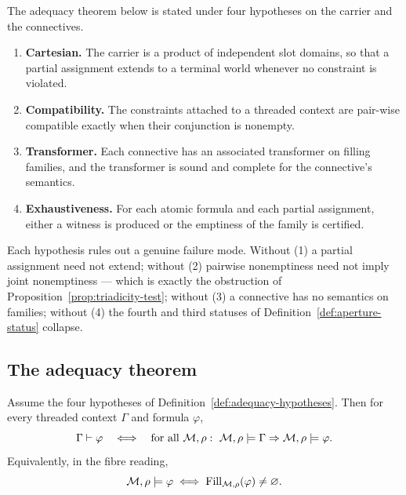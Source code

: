 \begin{definition}\label{def:adequacy-hypotheses}
The adequacy theorem below is stated under four hypotheses on the carrier and the
connectives.
\begin{enumerate}
\item \textbf{Cartesian.}  The carrier is a product of independent slot domains, so that a
  partial assignment extends to a terminal world whenever no constraint is violated.
\item \textbf{Compatibility.}  The constraints attached to a threaded context are
  pair-wise compatible exactly when their conjunction is nonempty.
\item \textbf{Transformer.}  Each connective has an associated transformer on filling
  families, and the transformer is sound and complete for the connective's semantics.
\item \textbf{Exhaustiveness.}  For each atomic formula and each partial assignment, either
  a witness is produced or the emptiness of the family is certified.
\end{enumerate}
\end{definition}

Each hypothesis rules out a genuine failure mode.  Without (1) a partial assignment need
not extend; without (2) pairwise nonemptiness need not imply joint nonemptiness --- which
is exactly the obstruction of Proposition~\ref{prop:triadicity-test}; without (3) a
connective has no semantics on families; without (4) the fourth and third statuses of
Definition~\ref{def:aperture-status} collapse.

\subsection{The adequacy theorem}

\begin{theorem}\label{thm:adequacy}
Assume the four hypotheses of Definition~\ref{def:adequacy-hypotheses}.  Then for every
threaded context $\Gamma$ and formula $\varphi$,
\[
  \Gamma\vdash\varphi
  \quad\Longleftrightarrow\quad
  \text{for all } \mathcal M,\rho:\ \mathcal M,\rho\models\Gamma \Rightarrow
  \mathcal M,\rho\models\varphi .
\]
Equivalently, in the fibre reading,
\[
  \mathcal M,\rho\models\varphi
  \iff
  \operatorname{Fill}_{\mathcal M,\rho}(\varphi)\neq\varnothing .
\]
\end{theorem}

